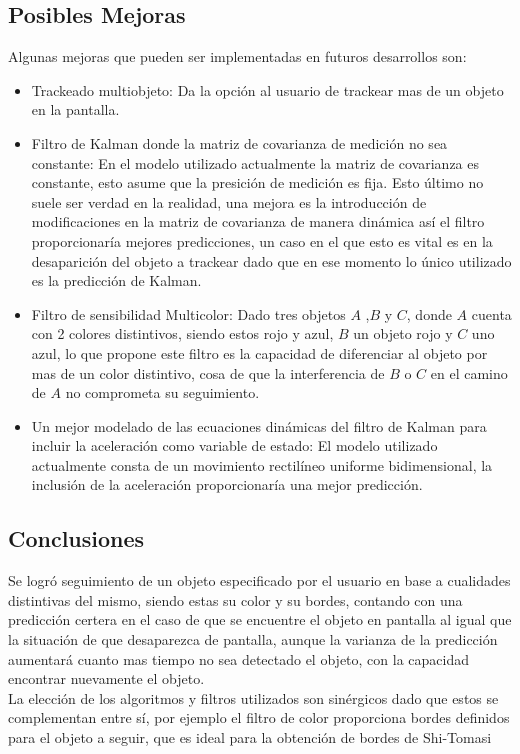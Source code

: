 \subsection{Posibles Mejoras}
Algunas mejoras que pueden ser implementadas en futuros desarrollos son:
\begin{itemize}
\item Trackeado multiobjeto:
Da la opción al usuario de trackear mas de un objeto en la pantalla.
\item Filtro de Kalman donde la matriz de covarianza de medición no sea constante:
En el modelo utilizado actualmente la matriz de covarianza es constante, esto asume que la presición de  medición es fija. Esto último no suele ser verdad en la realidad, una mejora es la introducción de modificaciones en la matriz de covarianza de manera dinámica así el filtro proporcionaría mejores predicciones, un caso en el que esto es vital es en la desaparición del objeto a trackear dado que en ese momento lo único utilizado es la predicción de Kalman. 
\item Filtro de sensibilidad Multicolor:
Dado tres objetos $A$ ,$B$ y $C$, donde $A$ cuenta con 2 colores distintivos, siendo estos rojo y azul, $B$ un objeto rojo y $C$ uno azul, lo que propone este filtro es la capacidad de diferenciar al objeto por mas de un color distintivo, cosa de que la interferencia de $B$ o $C$ en el camino de $A$ no comprometa su seguimiento.
\item Un mejor modelado de las ecuaciones dinámicas del filtro de Kalman para incluir la aceleración como variable de estado:
El modelo utilizado actualmente consta de un movimiento rectilíneo uniforme bidimensional, la inclusión de la aceleración proporcionaría una mejor predicción.
\end{itemize}




\subsection{Conclusiones}
Se logró seguimiento de un objeto especificado por el usuario en base a cualidades distintivas del mismo, siendo estas su color y su bordes, contando con una predicción certera en el caso de que se encuentre el objeto en pantalla al igual que la situación de que desaparezca de pantalla, aunque la varianza de la predicción aumentará cuanto mas tiempo no sea detectado el objeto, con la capacidad encontrar nuevamente el objeto.\\
La elección de los algoritmos y filtros utilizados son sinérgicos dado que estos se complementan entre sí, por ejemplo el filtro de color proporciona bordes definidos para el objeto a seguir, que es ideal para la obtención de bordes de Shi-Tomasi

